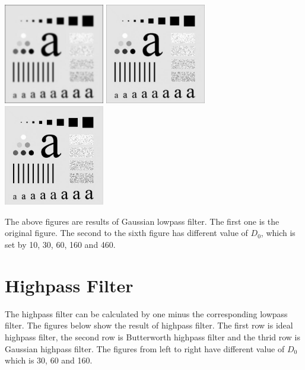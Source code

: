 \documentclass{article}
\begin{document}
\includegraphics[width=0.33\textwidth]{../data/gaussian_lowpass_60_characters_test_pattern.jpg}
\includegraphics[width=0.33\textwidth]{../data/gaussian_lowpass_160_characters_test_pattern.jpg}
\includegraphics[width=0.33\textwidth]{../data/gaussian_lowpass_460_characters_test_pattern.jpg}

The above figures are results of Gaussian lowpass filter. The first one is the original figure. The second to the sixth figure has different value of $D_0$, which is set by 10, 30, 60, 160 and 460.

\section{Highpass Filter}
The highpass filter can be calculated by one minus the corresponding lowpass filter. The figures below show the result of highpass filter. The first row is ideal highpass filter, the second row is Butterworth highpass filter and the thrid row is Gaussian highpass filter. The figures from left to right have different value of $D_0$ which is 30, 60 and 160.
\end{document}
